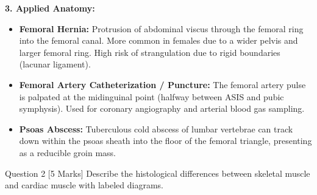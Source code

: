 \documentclass[11pt,a4paper]{article}
\begin{document}
\begin{ansbox}
\textbf{3. Applied Anatomy:}
\begin{itemize}[leftmargin=*]
    \item \textbf{Femoral Hernia:} Protrusion of abdominal viscus through the femoral ring into the femoral canal. More common in females due to a wider pelvis and larger femoral ring. High risk of strangulation due to rigid boundaries (lacunar ligament).
    \item \textbf{Femoral Artery Catheterization / Puncture:} The femoral artery pulse is palpated at the midinguinal point (halfway between ASIS and pubic symphysis). Used for coronary angiography and arterial blood gas sampling.
    \item \textbf{Psoas Abscess:} Tuberculous cold abscess of lumbar vertebrae can track down within the psoas sheath into the floor of the femoral triangle, presenting as a reducible groin mass.
\end{itemize}
\end{ansbox}

\begin{qbox}{Question 2 [5 Marks]}
Describe the histological differences between skeletal muscle and cardiac muscle with labeled diagrams.
\end{qbox}
\end{document}
